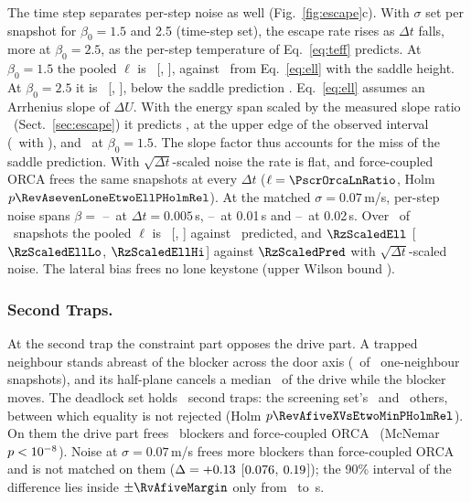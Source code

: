 The time step separates per-step noise as well (Fig.~\ref{fig:escape}c). With $\sigma$ set per snapshot for $\beta_0=1.5$ and 2.5 (time-step set), the escape rate rises as $\Delta t$ falls, more at $\beta_0=2.5$, as the per-step temperature of Eq.~\eqref{eq:teff} predicts. At $\beta_0=1.5$ the pooled $\ell$ is \RzTfourOnepfiveObs\ [\RzTfourOnepfiveLo, \RzTfourOnepfiveHi], against \RzTfourOnepfiveA\ from Eq.~\eqref{eq:ell} with the saddle height. At $\beta_0=2.5$ it is \RzTfourTwopfiveObs\ [\RzTfourTwopfiveLo, \RzTfourTwopfiveHi], below the saddle prediction \RzTfourTwopfiveA. Eq.~\eqref{eq:ell} assumes an Arrhenius slope of $\Delta U$. With the energy span scaled by the measured slope ratio \RzTtwoRatio\ (Sect.~\ref{sec:escape}) it predicts \RzTfourTwopfiveC, at the upper edge of the observed interval (\RzTfourTwopfiveCthree\ with \RvAthreeSlopeRatio), and \RzTfourOnepfiveC\ at $\beta_0=1.5$. The slope factor thus accounts for the miss of the saddle prediction. With $\sqrt{\Delta t}$-scaled noise the rate is flat, and force-coupled ORCA frees the same snapshots at every $\Delta t$ ($\ell=\PscrOrcaLnRatio$, Holm $p\RevAsevenLoneEtwoEllPHolmRel$). At the matched $\sigma=0.07$\,m/s, per-step noise spans $\beta=$ \RzStepBetaHalfMin--\RzStepBetaHalfMax\ at $\Delta t=0.005$\,s, \RzStepBetaOneMin--\RzStepBetaOneMax\ at 0.01\,s and \RzStepBetaTwoMin--\RzStepBetaTwoMax\ at 0.02\,s. Over \RwThreeStepNEll\ of \RwThreeN\ snapshots the pooled $\ell$ is \RzStepEll\ [\RzStepEllLo, \RzStepEllHi] against \RzStepPred\ predicted, and $\RzScaledEll$ [$\RzScaledEllLo$, $\RzScaledEllHi$] against $\RzScaledPred$ with $\sqrt{\Delta t}$-scaled noise. The lateral bias frees no lone keystone (upper Wilson bound \EtwoMaxBiasUpperLK).

\subsubsection{Second Traps.}
At the second trap the constraint part opposes the drive part. A trapped neighbour stands abreast of the blocker across the door axis (\CtwsixAbreastN\ of \CtwsixN\ one-neighbour snapshots), and its half-plane cancels a median \StHeldCancel\ of the drive while the blocker moves. The deadlock set holds \RevAfiveXPoolN\ second traps: the screening set's \RevAfiveXEtwoN\ and \RevAfiveXNewN\ others, between which equality is not rejected (Holm $p\RevAfiveXVsEtwoMinPHolmRel$). On them the drive part frees \RevAfiveXPoolDriveFreed\ blockers and force-coupled ORCA \RevAfiveXPoolOrcaFreed\ (McNemar $p<10^{-8}$). Noise at $\sigma=0.07$\,m/s frees more blockers than force-coupled ORCA and is not matched on them ($\Delta=+0.13$ [$0.076$, $0.19$]); the 90\% interval of the difference lies inside $\pm\RvAfiveMargin$ only from \RvAfiveSecondPoolWinOtherOneFrom\ to \RvAfiveSecondPoolWinOtherOneTo\,s.


